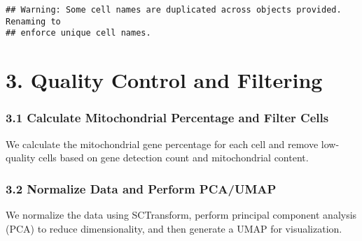 \documentclass[
]{article}
\newenvironment{Shaded}{\begin{snugshade}}{\end{snugshade}}
\newcommand{\AttributeTok}[1]{\textcolor[rgb]{0.13,0.29,0.53}{#1}}
\newcommand{\CommentTok}[1]{\textcolor[rgb]{0.56,0.35,0.01}{\textit{#1}}}
\newcommand{\DecValTok}[1]{\textcolor[rgb]{0.00,0.00,0.81}{#1}}
\newcommand{\FunctionTok}[1]{\textcolor[rgb]{0.13,0.29,0.53}{\textbf{#1}}}
\newcommand{\NormalTok}[1]{#1}
\newcommand{\OtherTok}[1]{\textcolor[rgb]{0.56,0.35,0.01}{#1}}
\newcommand{\SpecialCharTok}[1]{\textcolor[rgb]{0.81,0.36,0.00}{\textbf{#1}}}
\newcommand{\StringTok}[1]{\textcolor[rgb]{0.31,0.60,0.02}{#1}}
\begin{document}
\begin{verbatim}
## Warning: Some cell names are duplicated across objects provided. Renaming to
## enforce unique cell names.
\end{verbatim}

\section{3. Quality Control and
Filtering}\label{quality-control-and-filtering}

\subsubsection{3.1 Calculate Mitochondrial Percentage and Filter
Cells}\label{calculate-mitochondrial-percentage-and-filter-cells}

We calculate the mitochondrial gene percentage for each cell and remove
low-quality cells based on gene detection count and mitochondrial
content.

\begin{Shaded}
\end{Shaded}

\subsubsection{3.2 Normalize Data and Perform
PCA/UMAP}\label{normalize-data-and-perform-pcaumap}

We normalize the data using SCTransform, perform principal component
analysis (PCA) to reduce dimensionality, and then generate a UMAP for
visualization.
\end{document}
